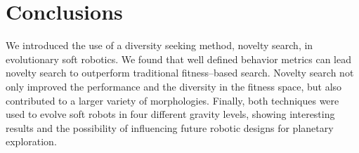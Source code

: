 \documentclass{sig-alternate}
\begin{document}
\section{Conclusions}
We introduced the use of a diversity seeking method, novelty search, in evolutionary soft robotics. 
We found that well defined behavior metrics can lead novelty search to outperform traditional fitness--based search. Novelty search not only improved the performance and the diversity in the fitness space, but also contributed to a larger variety of morphologies. Finally, both techniques were used to evolve soft robots in four different gravity levels, showing interesting results and the possibility of influencing future robotic designs for planetary exploration.



\end{document}
